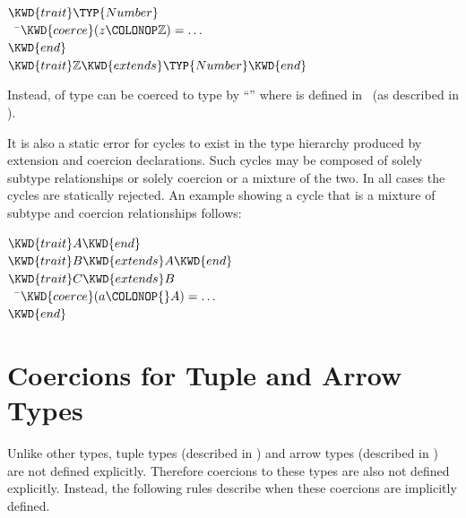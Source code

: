 \begin{Fortress}
\(\KWD{trait} \TYP{Number}\)\\
{\tt~~}\pushtabs\=\+\(  \KWD{coerce}(z\COLONOP\mathbb{Z}) = \ldots\)\-\\\poptabs
\(\KWD{end}\)\\[4pt]
\(\KWD{trait} \mathbb{Z} \KWD{extends} \TYP{Number} \KWD{end}\)
\end{Fortress}
Instead,  of type  can be coerced to type
 by
``''
where  is defined in \library\
(as described in ).


It is also a static error for cycles to exist in the type hierarchy
produced by extension and coercion declarations.  Such cycles may be
composed of solely subtype relationships or solely coercion or a
mixture of the two.  In all cases the cycles are statically rejected.
An example showing a cycle that is a mixture of subtype and coercion
relationships follows:


\begin{Fortress}
\(\KWD{trait} A \KWD{end} \)\\[4pt]
\(\KWD{trait} B \KWD{extends} A \KWD{end}\)\\[4pt]
\(\KWD{trait} C \KWD{extends} B\)\\
{\tt~~}\pushtabs\=\+\(  \KWD{coerce}(a\COLONOP{}A) = \ldots\)\-\\\poptabs
\(\KWD{end}\)
\end{Fortress}



\section{Coercions for Tuple and Arrow Types}

Unlike other types, tuple types (described in ) and
arrow types (described in \secref{arrow-types}) are
not defined explicitly.  Therefore coercions to these types are also
not defined explicitly.  Instead, the following rules describe when
these coercions are implicitly defined.

